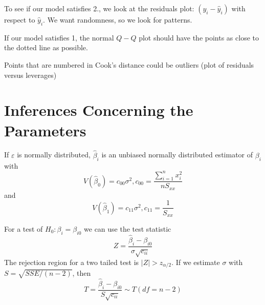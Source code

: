 \documentclass[12pt, a4paper, twoside, openright, titlepage]{book}
\begin{document}
\begin{rmk}{}{}
    To see if our model satisfies 2., we look at the residuals plot: $(y_i - \hat{y}_i)$ with respect to $\hat{y}_i$. We want randomness, so we look for patterns.
\end{rmk}

\begin{rmk}{}{}
    If our model satisfies 1, the normal $Q-Q$ plot should have the points as close to the dotted line as possible.
\end{rmk}

\begin{rmk}{}{}
    Points that are numbered in Cook's distance could be outliers (plot of residuals versus leverages)
\end{rmk}





\section{\textsection Inferences Concerning the Parameters}

\begin{rec}{}{}
    If $\varepsilon$ is normally distributed, $\hat{\beta}_i$ is an unbiased normally distributed estimator of $\beta_i$ with \begin{equation*}
        V(\hat{\beta}_0) = c_{00}\sigma^2, c_{00} = \frac{\sum_{i=1}^nx_i^2}{nS_{xx}}
    \end{equation*}
    and \begin{equation*}
        V(\hat{\beta}_1) = c_{11}\sigma^2, c_{11} = \frac{1}{S_{xx}}
    \end{equation*}
\end{rec}

\begin{prop}{}{}
    For a test of $H_0:\beta_i = \beta_{i0}$ we can use the test statistic \begin{equation*}
        Z = \frac{\hat{\beta}_i - \beta_{i0}}{\sigma\sqrt{c_{ii}}}
    \end{equation*}
    The rejection region for a two tailed test is $|Z| > z_{\alpha/2}$. If we estimate $\sigma$ with $S = \sqrt{SSE/(n-2)}$, then \begin{equation*}
        T = \frac{\hat{\beta}_i - \beta_{i0}}{S\sqrt{c_{ii}}} \sim T(df = n-2)
    \end{equation*}
\end{prop}
\end{document}
